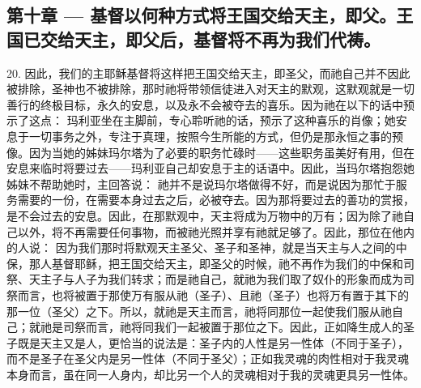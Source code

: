 \subsection{第十章 — 基督以何种方式将王国交给天主，即父。王国已交给天主，即父后，基督将不再为我们代祷。}

20. 因此，我们的主耶稣基督将这样把王国交给天主，即圣父，而祂自己并不因此被排除，圣神也不被排除，那时祂将带领信徒进入对天主的默观，这默观就是一切善行的终极目标，永久的安息，以及永不会被夺去的喜乐。因为祂在以下的话中预示了这点：  玛利亚坐在主脚前，专心聆听祂的话，预示了这种喜乐的肖像；她安息于一切事务之外，专注于真理，按照今生所能的方式，但仍是那永恒之事的预像。因为当她的姊妹玛尔塔为了必要的职务忙碌时——这些职务虽美好有用，但在安息来临时将要过去——玛利亚自己却安息于主的话语中。因此，当玛尔塔抱怨她姊妹不帮助她时，主回答说：  祂并不是说玛尔塔做得不好，而是说因为那忙于服务需要的一份，在需要本身过去之后，必被夺去。因为那将要过去的善功的赏报，是不会过去的安息。因此，在那默观中，天主将成为万物中的万有；因为除了祂自己以外，将不再需要任何事物，而被祂光照并享有祂就足够了。因此，那位在他内  的人说：  因为我们那时将默观天主圣父、圣子和圣神，就是当天主与人之间的中保，那人基督耶稣，把王国交给天主，即圣父的时候，祂不再作为我们的中保和司祭、天主子与人子为我们转求；而是祂自己，就祂为我们取了奴仆的形象而成为司祭而言，也将被置于那使万有服从祂（圣子）、且祂（圣子）也将万有置于其下的那一位（圣父）之下。所以，就祂是天主而言，祂将同那位一起使我们服从祂自己；就祂是司祭而言，祂将同我们一起被置于那位之下。因此，正如降生成人的圣子既是天主又是人，更恰当的说法是：圣子内的人性是另一性体（不同于圣子），而不是圣子在圣父内是另一性体（不同于圣父）；正如我灵魂的肉性相对于我灵魂本身而言，虽在同一人身内，却比另一个人的灵魂相对于我的灵魂更具另一性体。\par

